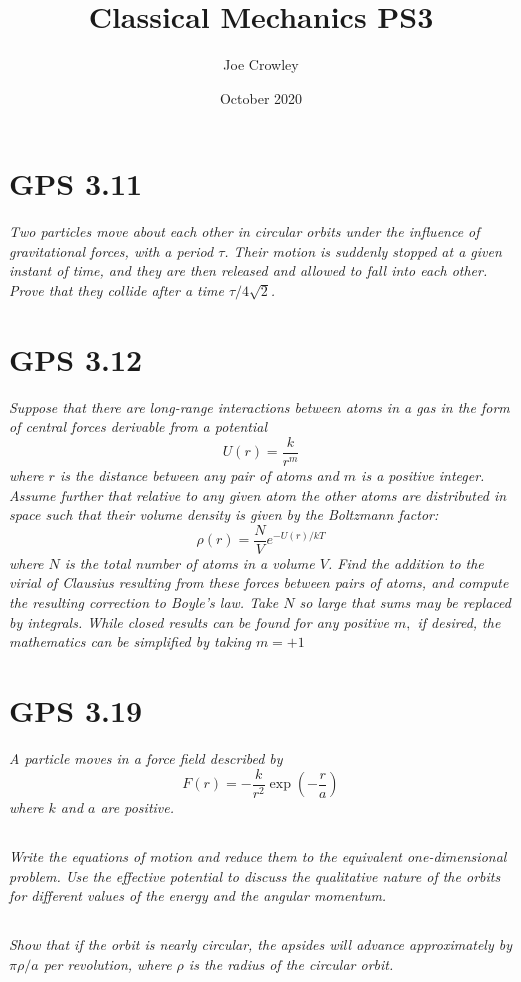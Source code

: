 \documentclass{article}
\title{Classical Mechanics  PS3}
\author{Joe Crowley}
\date{October 2020}
\begin{document}
  

\section{GPS 3.11}
\textit{Two particles move about each other in circular orbits under the influence of gravitational forces, with a period $\tau$. Their motion is suddenly stopped at a given instant of time, and they are then released and allowed to fall into each other. Prove that they collide after a time $\tau / 4 \sqrt{2}$.}

\newpage



\section{GPS 3.12}
\textit{Suppose that there are long-range interactions between atoms in a gas in the form of central forces derivable from a potential
$$
U(r)=\frac{k}{r^{m}}
$$
where $r$ is the distance between any pair of atoms and $m$ is a positive integer. Assume further that relative to any given atom the other atoms are distributed in space such that their volume density is given by the Boltzmann factor:
$$
\rho(r)=\frac{N}{V} e^{-U(r) / k T}
$$
where $N$ is the total number of atoms in a volume $V$. Find the addition to the virial of Clausius resulting from these forces between pairs of atoms, and compute the resulting correction to Boyle's law. Take $N$ so large that sums may be replaced by integrals. While closed results can be found for any positive $m,$ if desired, the mathematics can be simplified by taking $m=+1$}
\newpage


\section{GPS 3.19}
\textit{A particle moves in a force field described by
$$
F(r)=-\frac{k}{r^{2}} \exp \left(-\frac{r}{a}\right)
$$
where $k$ and $a$ are positive.}


\subsection{}
\textit{Write the equations of motion and reduce them to the equivalent one-dimensional problem. Use the effective potential to discuss the qualitative nature of the orbits for different values of the energy and the angular momentum.}


\subsection{}
\textit{Show that if the orbit is nearly circular, the apsides will advance approximately by $\pi \rho / a$ per revolution, where $\rho$ is the radius of the circular orbit.}
\end{document}
